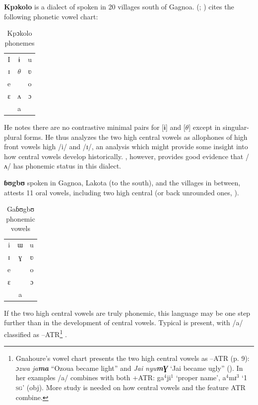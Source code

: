 \documentclass[output=paper
,newtxmath
,modfonts
,nonflat]{langsci/langscibook}
\begin{document}
\textbf{Kpɔkolo} is a dialect of  spoken in 20 villages south of Gagnoa. \citeauthor{Goprou2014} (\citeyear{Goprou2010}; \citeyear[175, 179]{Goprou2014}) cites the following phonetic vowel chart: 

\begin{table}
\caption{Kpↄkolo phonemes}
\label{tab:zogbo:12}
\begin{tabular}{ccc}
I  &  ɨ  &  u\\

ɪ  &  $\theta$  &  ʋ\\

e   & &    o\\

ɛ   & ʌ  &  ɔ\\

	& a\\
\end{tabular}	
\end{table}


He notes there are no contrastive minimal pairs for [ɨ] and [$\theta$] except in singular-plural forms.  He thus analyzes the two high central vowels as allophones of high front vowels high /i/ and /ɪ/, an analysis which might provide some insight into how central vowels develop historically. \citet{Vahoua2011}, however, provides good evidence that /ʌ/ has phonemic status in this dialect.    

\textbf{ɓʊgbʊ} spoken in Gagnoa, Lakota (to the south), and the villages in between, attests 11 oral vowels, including two high central (or back unrounded ones, \citealt[5, 9]{Gnahore2006}). 

\begin{table}
	\caption{Gaɓʊgbʊ phonemic vowels}
	\label{tab:zogbo:13}
	\begin{tabular}{ccc}
i  &  ɯ  &   u\\

ɪ    & ɣ &   ʋ\\

e    & &   o\\

ɛ    & &  ɔ\\

	& a\\
	\end{tabular}
\end{table}


If the two high central vowels are truly phonemic, this language may be one step further than  in the development of central vowels. Typical  is present, with /a/ classified as –ATR\footnote{Gnahoure’s vowel chart presents the two high central vowels as –ATR (p. 9): \textit{ɔzwa ja}\textbf{\textit{ma}}  “Ozoua became light” and \textit{Jai nyu}\textbf{\textit{m}}\textbf{\textit{Ɣ}}  ‘Jai became ugly” (\citeyear[25]{Gnahore2006}).  In her examples /a/ combines with both +ATR:  ga$^4$ji$^1$ ‘proper name’, a$^4$mɪ$^3$ ‘1 \textsc{sg}’ (obj).  More study is needed on how central vowels and the feature ATR combine.} . 
\end{document}
